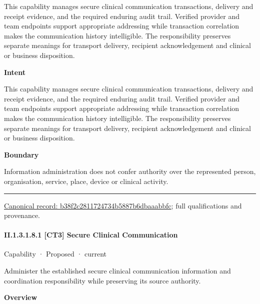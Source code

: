 This capability manages secure clinical communication transactions, delivery and receipt evidence, and the required enduring audit trail. Verified provider and team endpoints support appropriate addressing while transaction correlation makes the communication history intelligible. The responsibility preserves separate meanings for transport delivery, recipient acknowledgement and clinical or business disposition.



\textbf{Intent}



This capability manages secure clinical communication transactions, delivery and receipt evidence, and the required enduring audit trail. Verified provider and team endpoints support appropriate addressing while transaction correlation makes the communication history intelligible. The responsibility preserves separate meanings for transport delivery, recipient acknowledgement and clinical or business disposition.



\textbf{Boundary}



Information administration does not confer authority over the represented person, organisation, service, place, device or clinical activity.



\medskip\hrule\medskip

{\footnotesize \href{../../../../continuum/strategy/capability/b38f2c2811724734b5887b6dbaaabbfc.md}{Canonical record: b38f2c2811724734b5887b6dbaaabbfc}; full qualifications and provenance.}\par
\paragraph*{II.1.3.1.8.1 [CT3] Secure Clinical Communication}
\label{navigation:II.1.3.1.8.1}

\label{element:eddb86c7922145439b9dcf0259f4aed5}
{\small Capability · Proposed · current}\par

Administer the established secure clinical communication information and coordination responsibility while preserving its source authority.



\textbf{Overview}



